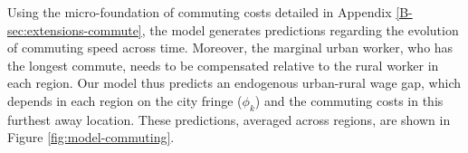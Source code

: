\documentclass[./20250130-paper.tex]{subfiles}
\begin{document}
% 			
% 			





 Using the micro-foundation of commuting costs detailed in Appendix \ref{B-sec:extensions-commute}, the model generates predictions regarding the evolution of commuting speed across time. Moreover, the marginal urban worker, who has the longest commute, needs to be compensated relative to the rural worker in each region. Our model thus predicts an endogenous urban-rural wage gap, which depends in each region on the city fringe ($\phi_k$) and the commuting costs in this furthest away location. These predictions, averaged across regions, are shown in Figure \ref{fig:model-commuting}. 
\end{document}
